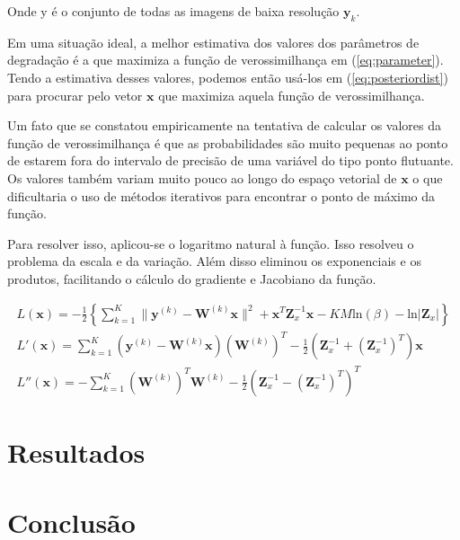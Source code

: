 \documentclass[12pt,openright,oneside,a4paper,english,brazil]{abntex2}
\begin{document}
Onde y é o conjunto de todas as imagens de baixa resolução $\mathbf{y}_k$.

Em uma situação ideal, a melhor estimativa dos valores dos parâmetros de degradação é a que maximiza a função de verossimilhança em (\ref{eq:parameter}).
Tendo a estimativa desses valores, podemos então usá-los em (\ref{eq:posteriordist}) para procurar pelo vetor $\mathbf{x}$ que maximiza aquela função de verossimilhança.

Um fato que se constatou empiricamente na tentativa de calcular os valores da função de verossimilhança é que as probabilidades são muito pequenas ao ponto de estarem fora do intervalo de precisão de uma variável do tipo ponto flutuante.
Os valores também variam muito pouco ao longo do espaço vetorial de $\mathbf{x}$ o que dificultaria o uso de métodos iterativos para encontrar o ponto de máximo da função.

Para resolver isso, aplicou-se o logaritmo natural à função. Isso resolveu o problema da escala e da variação.
Além disso eliminou os exponenciais e os produtos, facilitando o cálculo do gradiente e Jacobiano da função.

\begin{gather}
	L(\mathbf{x}) = -\frac{1}{2} \left\{ \sum^K_{k=1} \|\mathbf{y}^{(k)} - \mathbf{W}^{(k)} \mathbf{x} \|^2 + \mathbf{x}^T\mathbf{Z}^{-1}_x\mathbf{x} - KM\mathrm{ln}(\beta) - \mathrm{ln}|\mathbf{Z}_x| \right\} \\ 
	L'(\mathbf{x}) =  \sum^K_{k=1}  (\mathbf{y}^{(k)} - \mathbf{W}^{(k)}\mathbf{x})(\mathbf{W}^{(k)})^T  - \frac{1}{2}(\mathbf{Z}^{-1}_x + (\mathbf{Z}^{-1}_x)^T)\mathbf{x}  \\
	L''(\mathbf{x}) =  -\sum^K_{k=1} (\mathbf{W}^{(k)})^T\mathbf{W}^{(k)} - \frac{1}{2}(\mathbf{Z}^{-1}_x - (\mathbf{Z}^{-1}_x)^T)^T
\end{gather}


\chapter{Resultados}

\chapter{Conclusão}

\postextual



\end{document}
